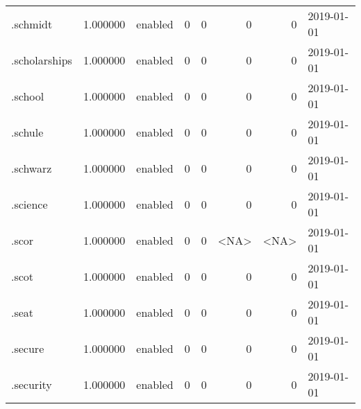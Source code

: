 \begin{tabular}{lrlrrrrl}
.schmidt                  &          1.000000 &         enabled &                           0 &                           0 &                           0 &                   0 &           2019-01-01 \\
.scholarships             &          1.000000 &         enabled &                           0 &                           0 &                           0 &                   0 &           2019-01-01 \\
.school                   &          1.000000 &         enabled &                           0 &                           0 &                           0 &                   0 &           2019-01-01 \\
.schule                   &          1.000000 &         enabled &                           0 &                           0 &                           0 &                   0 &           2019-01-01 \\
.schwarz                  &          1.000000 &         enabled &                           0 &                           0 &                           0 &                   0 &           2019-01-01 \\
.science                  &          1.000000 &         enabled &                           0 &                           0 &                           0 &                   0 &           2019-01-01 \\
.scor                     &          1.000000 &         enabled &                           0 &                           0 &                        <NA> &                <NA> &           2019-01-01 \\
.scot                     &          1.000000 &         enabled &                           0 &                           0 &                           0 &                   0 &           2019-01-01 \\
.seat                     &          1.000000 &         enabled &                           0 &                           0 &                           0 &                   0 &           2019-01-01 \\
.secure                   &          1.000000 &         enabled &                           0 &                           0 &                           0 &                   0 &           2019-01-01 \\
.security                 &          1.000000 &         enabled &                           0 &                           0 &                           0 &                   0 &           2019-01-01 \\

\end{tabular}
